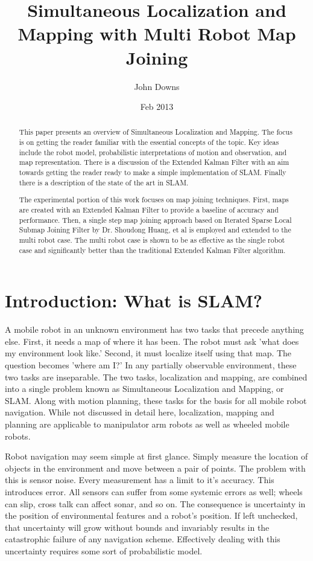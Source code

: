 \documentclass[12pt]{report}
\title{Simultaneous Localization and Mapping with Multi Robot Map Joining}
\author{John Downs}
\date{Feb 2013}
\begin{document}
\maketitle
\tableofcontents 


\begin{abstract}
This paper presents an overview of Simultaneous Localization and Mapping.  The focus is on getting the reader familiar with the essential concepts of the topic.  Key ideas include the robot model, probabilistic interpretations of motion and observation, and map representation.  There is a discussion of the Extended Kalman Filter with an aim towards getting the reader ready to make a simple implementation of SLAM.  Finally there is a description of the state of the art in SLAM.  

The experimental portion of this work focuses on map joining techniques.  First, maps are created with an Extended Kalman Filter to provide a baseline of accuracy and performance.  Then, a single step map joining approach based on Iterated Sparse Local Submap Joining Filter by Dr. Shoudong Huang, et al is employed and extended to the multi robot case.  The multi robot case is shown to be as effective as the single robot case and significantly better than the traditional Extended Kalman Filter algorithm.

\end{abstract}
 
 
\chapter{Introduction: What is SLAM?}

A mobile robot in an unknown environment has two tasks that precede anything else.  First, it needs a map of where it has been.  The robot must ask 'what does my environment look like.'  Second, it must localize itself using that map.  The question becomes 'where am I?'  In any partially observable environment, these two tasks are inseparable.  The two tasks, localization and mapping, are combined into a single problem known as Simultaneous Localization and Mapping, or SLAM.  Along with motion planning, these tasks for the basis for all mobile robot navigation.  While not discussed in detail here, localization, mapping and planning are applicable to manipulator arm robots as well as wheeled mobile robots.

Robot navigation may seem simple at first glance.  Simply measure the location of objects in the environment and move between a pair of points.  The problem with this is sensor noise.  Every measurement has a limit to it's accuracy.  This introduces error.  All sensors can suffer from some systemic errors as well; wheels can slip, cross talk can affect sonar, and so on.  The consequence is uncertainty in the position of environmental features and a robot's position.  If left unchecked, that uncertainty will grow without bounds and invariably results in the catastrophic failure of any navigation scheme.  Effectively dealing with this uncertainty requires some sort of probabilistic model.
\end{document}
